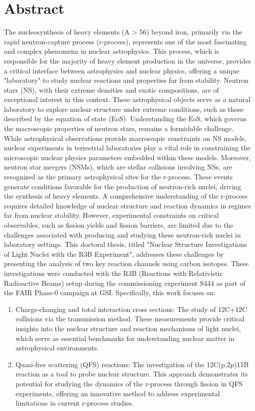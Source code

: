 \thispagestyle{empty}
\section*{Abstract}
The nucleosynthesis of heavy elements (A > 56) beyond iron, primarily via the rapid neutron-capture process (r-process), represents one of the most fascinating and complex phenomena in nuclear astrophysics. This process, which is responsible for the majority of heavy element production in the universe, provides a critical interface between astrophysics and nuclear physics, offering a unique "laboratory" to study nuclear reactions and properties far from stability. Neutron stars (NS), with their extreme densities and exotic compositions, are of exceptional interest in this context. These astrophysical objects serve as a natural laboratory to explore nuclear structure under extreme conditions, such as those described by the equation of state (EoS). Understanding the EoS, which governs the macroscopic properties of neutron stars, remains a formidable challenge. While astrophysical observations provide macroscopic constraints on NS models, nuclear experiments in terrestrial laboratories play a vital role in constraining the microscopic nuclear physics parameters embedded within these models.
Moreover, neutron star mergers (NSMs), which are stellar collisions involving NSs, are recognized as the primary astrophysical sites for the r-process. These events generate conditions favorable for the production of neutron-rich nuclei, driving the synthesis of heavy elements. A comprehensive understanding of the r-process requires detailed knowledge of nuclear structure and reaction dynamics in regimes far from nuclear stability. However, experimental constraints on critical observables, such as fission yields and fission barriers, are limited due to the challenges associated with producing and studying these neutron-rich nuclei in laboratory settings.
This doctoral thesis, titled "Nuclear Structure Investigations of Light Nuclei with the R3B Experiment", addresses these challenges by presenting the analysis of two key reaction channels using carbon isotopes. These investigations were conducted with the R3B (Reactions with Relativistic Radioactive Beams) setup during the commissioning experiment S444 as part of the FAIR Phase-0 campaign at GSI. Specifically, this work focuses on:
\begin{enumerate}
\item Charge-changing and total interaction cross sections: The study of 12C+12C collisions via the transmission method. These measurements provide critical insights into the nuclear structure and reaction mechanisms of light nuclei, which serve as essential benchmarks for understanding nuclear matter in astrophysical environments.
\item Quasi-free scattering (QFS) reactions: The investigation of the 12C(p,2p)11B reaction as a tool to probe nuclear structure. This approach demonstrates its potential for studying the dynamics of the r-process through fission in QFS experiments, offering an innovative method to address experimental limitations in current r-process studies.
\end{enumerate}
